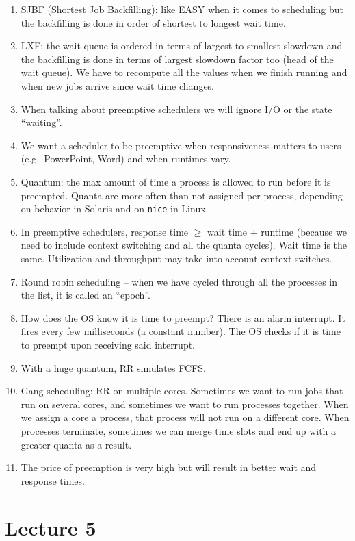 \documentclass[12pt,a4paper]{article}
\begin{document}
\begin{enumerate}
  \item SJBF (Shortest Job Backfilling): like EASY when it comes to scheduling but the backfilling is done in order of shortest to longest wait time.
  \item LXF: the wait queue is ordered in terms of largest to smallest slowdown and the backfilling is done in terms of largest slowdown factor too (head of the wait queue). We have to recompute all the values when we finish running and when new jobs arrive since wait time changes.
  \item When talking about preemptive schedulers we will ignore I/O or the state ``waiting''.
  \item We want a scheduler to be preemptive when responsiveness matters to users (e.g.\ PowerPoint, Word) and when runtimes vary.
  \item Quantum: the max amount of time a process is allowed to run before it is preempted. Quanta are more often than not assigned per process, depending on behavior in Solaris and on \texttt{nice} in Linux.
  \item In preemptive schedulers, response time $\geq$ wait time $+$ runtime (because we need to include context switching and all the quanta cycles). Wait time is the same. Utilization and throughput may take into account context switches.
  \item Round robin scheduling -- when we have cycled through all the processes in the list, it is called an ``epoch''.
  \item How does the OS know it is time to preempt? There is an alarm interrupt. It fires every few milliseconds (a constant number). The OS checks if it is time to preempt upon receiving said interrupt.
  \item With a huge quantum, RR simulates FCFS.
  \item Gang scheduling: RR on multiple cores. Sometimes we want to run jobs that run on several cores, and sometimes we want to run processes together. When we assign a core a process, that process will not run on a different core. When processes terminate, sometimes we can merge time slots and end up with a greater quanta as a result.
  \item The price of preemption is very high but will result in better wait and response times.
\end{enumerate}

\section{Lecture 5}
\end{document}
